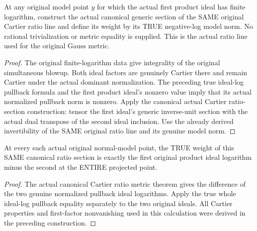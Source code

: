 \begin{definition}
\label{local:actual-normalized-full-point-ratio-section}
\leanok
{}
At any original model point $y$ for which the actual first product ideal
has finite logarithm, construct the actual canonical generic section of
the SAME original Cartier ratio line and define its weight by its TRUE
negative-log model norm. No rational trivialization or metric equality is
supplied. This is the actual ratio line used for the original Gauss metric.
\end{definition}
\begin{proof}
The original finite-logarithm data give integrality of the original
simultaneous blowup. Both ideal factors are genuinely Cartier there and
remain Cartier under the actual dominant normalization. The preceding
true ideal-log pullback formula and the first product ideal's nonzero
value imply that its actual normalized pullback norm is nonzero.
Apply the canonical actual Cartier ratio-section construction: tensor
the first ideal's generic inverse-unit section with the actual dual
transpose of the second ideal inclusion. Use the already derived
invertibility of the SAME original ratio line and its genuine model norm.
\end{proof}

\begin{theorem}
\label{local:actual-normalized-full-point-ratio-weight}
\leanok
{}
At every such actual original normal-model point, the TRUE weight of
this SAME canonical ratio section is exactly the first original product
ideal logarithm minus the second at the ENTIRE projected point.
\end{theorem}
\begin{proof}
The actual canonical Cartier ratio metric theorem gives the difference
of the two genuine normalized pullback ideal logarithms. Apply the true
whole ideal-log pullback equality separately to the two original ideals.
All Cartier properties and first-factor nonvanishing used in this
calculation were derived in the preceding construction.
\end{proof}
